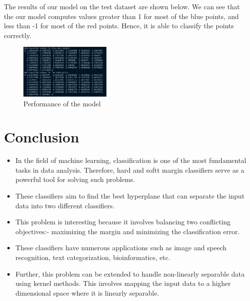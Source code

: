\documentclass[journal]{IEEEtran}
\begin{document}
The results of our model on the test dataset are shown below. We can see that the our model computes values greater than 1 for most of the blue points, and less than -1 for most of the red points. Hence, it is able to classify the points correctly.
\begin{figure}[!ht]
    \centering
    \includegraphics[width=0.4\textwidth]{result.png}
    \caption{Performance of the model}
    \label{fig:res3}
\end{figure}

\section{\textbf{Conclusion}}
\begin{itemize}
    \item In the field of machine learning, classification is one of the most fundamental tasks in data analysis. Therefore, hard and softt margin classifiers serve as a powerful tool for solving such problems.
    \item These classifiers aim to find the best hyperplane that can separate the input data into two different classifiers.
    \item This problem is interesting because it involves balancing two conflicting objectives:- maximizing the margin and minimizing the classification error.
    \item These classifiers have numerous applications such as image and speech recognition, text categorization, bioinformatics, etc.
    \item Further, this problem can be extended to handle non-linearly separable data using kernel methods. This involves mapping the input data to a higher dimensional space where it is linearly separable.
\end{itemize}


\pagebreak
\end{document}
